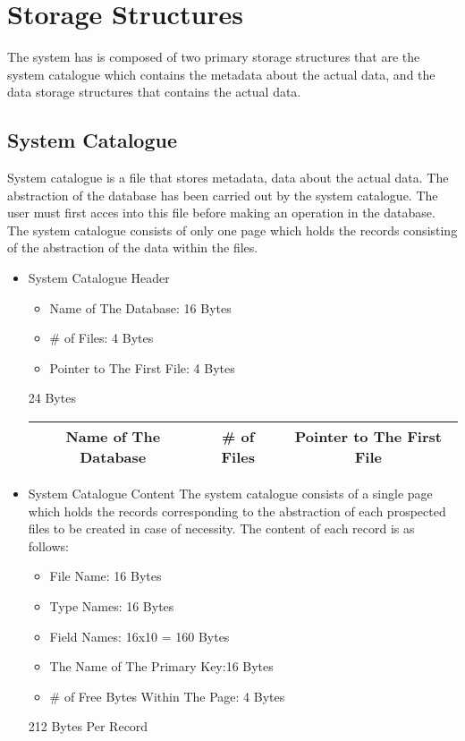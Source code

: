 \documentclass[12pt]{article}
\begin{document}
\section{\large Storage Structures}
\tab The system has is composed of two primary storage structures that are the system catalogue which contains the metadata about the actual data, and the data storage structures that contains the actual data.

\subsection{System Catalogue}
\tab System catalogue is a file that stores metadata, data about the actual data. The abstraction of the database has been carried out by the system catalogue. The user must first acces into this file before making an operation in the database. The system catalogue consists of only one page which holds the records consisting of the abstraction of the data within the files. 

\begin{itemize}
    \item System Catalogue Header 
        \begin{itemize}
            \item Name of The Database: 16 Bytes
            \item \# of Files: 4 Bytes
            \item Pointer to The First File: 4 Bytes
        \end{itemize}
        24 Bytes
        
        \begin{center}
        \begin{tabular}{|c|c|c|}
            \hline
            Name of The Database & \# of Files & Pointer to The First File \\
            \hline
        \end{tabular}
        \end{center}
    
    \item System Catalogue Content \newline
    The system catalogue consists of a single page which holds the records corresponding to the abstraction of each prospected files to be created in case of necessity. The content of each record is as follows:
    
        \begin{itemize} 
            \item File Name: 16 Bytes
            \item Type Names: 16 Bytes
            \item Field Names: 16x10 = 160 Bytes
            \item The Name of The Primary Key:16 Bytes
            \item \# of Free Bytes Within The Page: 4 Bytes
        \end{itemize}
    
    212 Bytes Per Record 
        
\end{itemize}
\end{document}
